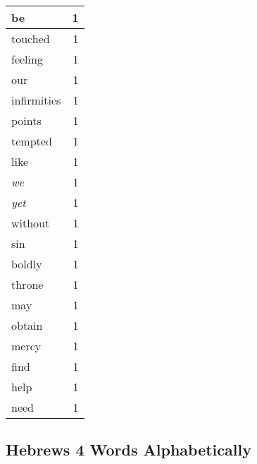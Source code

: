 \begin{center}
\begin{longtable}{l|r}
be & 1\\ \hline 
touched & 1\\ \hline 
feeling & 1\\ \hline 
our & 1\\ \hline 
infirmities & 1\\ \hline 
points & 1\\ \hline 
tempted & 1\\ \hline 
like & 1\\ \hline 
\emph{we} & 1\\ \hline 
\emph{yet} & 1\\ \hline 
without & 1\\ \hline 
sin & 1\\ \hline 
boldly & 1\\ \hline 
throne & 1\\ \hline 
may & 1\\ \hline 
obtain & 1\\ \hline 
mercy & 1\\ \hline 
find & 1\\ \hline 
help & 1\\ \hline 
need & 1\\ \hline 
\end{longtable}
\end{center}





\subsection{Hebrews 4 Words Alphabetically}


\normalsize
 
